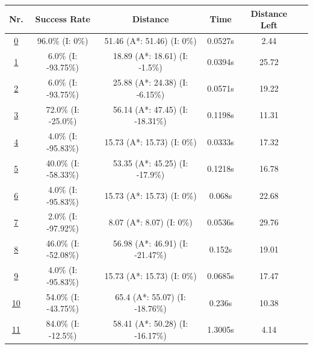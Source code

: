 \begin{table}[h!] 
\footnotesize
\centering


\begin{tabular}{|cc|c|c|c|c|c|}
\hline
\multicolumn{2}{|c|}{\textbf{Nr.}} & \textbf{Success Rate} & \textbf{Distance} & \textbf{Time} & \textbf{Distance Left}\\
\hline
\hline
\multicolumn{2}{|c|}{\cellcolor{lightgray!20} \hyperref[tab: evalalgorithms]{0}} & 96.0\% (I: 0\%) & 51.46 (A*: 51.46) (I: 0\%) & 0.0527s & 2.44\\
\hline
\hline
\multicolumn{2}{|c|}{\cellcolor{red!40} \hyperref[tab: evalalgorithms]{1}} & 6.0\% (I: -93.75\%) & 18.89 (A*: 18.61) (I: -1.5\%) & 0.0394s & 25.72\\
\hline
\multicolumn{2}{|c|}{\cellcolor{red!20} \hyperref[tab: evalalgorithms]{2}} & 6.0\% (I: -93.75\%) & 25.88 (A*: 24.38) (I: -6.15\%) & 0.0571s & 19.22\\
\hline
\multicolumn{2}{|c|}{\cellcolor{red!20} \hyperref[tab: evalalgorithms]{3}} & 72.0\% (I: -25.0\%) & 56.14 (A*: 47.45) (I: -18.31\%) & 0.1198s & 11.31\\
\hline
\multicolumn{2}{|c|}{\cellcolor{red!20} \hyperref[tab: evalalgorithms]{4}} & 4.0\% (I: -95.83\%) & 15.73 (A*: 15.73) (I: 0\%) & 0.0333s & 17.32\\
\hline
\multicolumn{2}{|c|}{\cellcolor{red!20} \hyperref[tab: evalalgorithms]{5}} & 40.0\% (I: -58.33\%) & 53.35 (A*: 45.25) (I: -17.9\%) & 0.1218s & 16.78\\
\hline
\hline
\multicolumn{2}{|c|}{\cellcolor{blue!20} \hyperref[tab: evalalgorithms]{6}} & 4.0\% (I: -95.83\%) & 15.73 (A*: 15.73) (I: 0\%) & 0.068s & 22.68\\
\hline
\multicolumn{2}{|c|}{\cellcolor{blue!40} \hyperref[tab: evalalgorithms]{7}} & 2.0\% (I: -97.92\%) & 8.07 (A*: 8.07) (I: 0\%) & 0.0536s & 29.76\\
\hline
\multicolumn{2}{|c|}{\cellcolor{blue!20} \hyperref[tab: evalalgorithms]{8}} & 46.0\% (I: -52.08\%) & 56.98 (A*: 46.91) (I: -21.47\%) & 0.152s & 19.01\\
\hline
\multicolumn{2}{|c|}{\cellcolor{blue!20} \hyperref[tab: evalalgorithms]{9}} & 4.0\% (I: -95.83\%) & 15.73 (A*: 15.73) (I: 0\%) & 0.0685s & 17.47\\
\hline
\multicolumn{2}{|c|}{\cellcolor{blue!20} \hyperref[tab: evalalgorithms]{10}} & 54.0\% (I: -43.75\%) & 65.4 (A*: 55.07) (I: -18.76\%) & 0.236s & 10.38\\
\hline
\hline
\multicolumn{2}{|c|}{\cellcolor{orange!40} \hyperref[tab: evalalgorithms]{11}} & 84.0\% (I: -12.5\%) & 58.41 (A*: 50.28) (I: -16.17\%) & 1.3005s & 4.14\\

\end{tabular}
\end{table}
